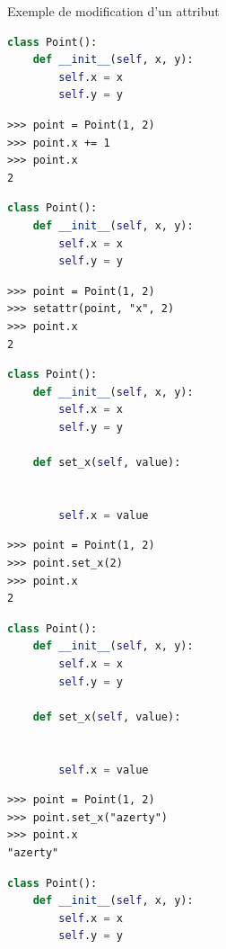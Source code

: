 \documentclass[10pt]{beamer}
\begin{document}
\begin{frame}[fragile]{Exemple de modification d'un attribut}

\begin{overprint}

\begin{lstlisting}[language=Python, numbers=none]
class Point():
    def __init__(self, x, y):
        self.x = x
        self.y = y
\end{lstlisting}

\begin{lstlisting}[numbers=none]
>>> point = Point(1, 2)
>>> point.x += 1
>>> point.x
2
\end{lstlisting}

\begin{lstlisting}[language=Python, numbers=none]
class Point():
    def __init__(self, x, y):
        self.x = x
        self.y = y
\end{lstlisting}

\begin{lstlisting}[numbers=none]
>>> point = Point(1, 2)
>>> setattr(point, "x", 2)
>>> point.x
2
\end{lstlisting}


\begin{lstlisting}[language=Python, numbers=none]
class Point():
    def __init__(self, x, y):
        self.x = x
        self.y = y

    def set_x(self, value):


        self.x = value
\end{lstlisting}

\begin{lstlisting}[numbers=none]
>>> point = Point(1, 2)
>>> point.set_x(2)
>>> point.x
2
\end{lstlisting}


\begin{lstlisting}[language=Python, numbers=none]
class Point():
    def __init__(self, x, y):
        self.x = x
        self.y = y

    def set_x(self, value):


        self.x = value
\end{lstlisting}

\begin{lstlisting}[numbers=none]
>>> point = Point(1, 2)
>>> point.set_x("azerty")
>>> point.x
"azerty"
\end{lstlisting}


\begin{lstlisting}[language=Python, numbers=none]
class Point():
    def __init__(self, x, y):
        self.x = x
        self.y = y


\end{lstlisting}
\end{overprint}
\end{frame}
\end{document}
